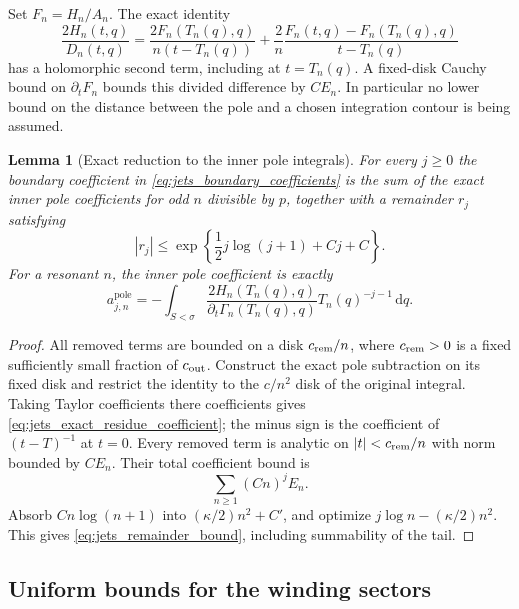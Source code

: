 \documentclass[11pt]{article}
\numberwithin{equation}{section}
\newtheorem{lemma}[theorem]{Lemma}
\theoremstyle{definition}
\newcommand{\dd}{\,\mathrm d}
\begin{document}
Set $F_n=H_n/A_n$. The exact identity
\begin{equation}\label{eq:jets_divided_difference}
 \frac{2H_n(t,q)}{D_n(t,q)}=
 \frac{2F_n(T_n(q),q)}{n(t-T_n(q))}
 +\frac2n\frac{F_n(t,q)-F_n(T_n(q),q)}{t-T_n(q)}
\end{equation}
has a holomorphic second term, including at $t=T_n(q)$. A
fixed-disk Cauchy bound on $\partial_tF_n$ bounds this divided
difference by $CE_n$. In particular no lower bound on the distance
between the pole and a chosen integration contour is being assumed.

\begin{lemma}[Exact reduction to the inner pole integrals]
\label{lem:jets_remainder}
For every $j\ge0$ the boundary coefficient in
\eqref{eq:jets_boundary_coefficients} is the sum of the exact inner
pole coefficients for odd $n$ divisible by $p$, together with a
remainder $r_j$ satisfying
\begin{equation}\label{eq:jets_remainder_bound}
 |r_j|\le \exp\left\{\frac12j\log(j+1)+Cj+C\right\}.
\end{equation}
For a resonant $n$, the inner pole coefficient is exactly
\begin{equation}\label{eq:jets_exact_residue_coefficient}
 a_{j,n}^{\mathrm{pole}}=
 -\int_{S<\sigma}
  \frac{2H_n(T_n(q),q)}{\partial_t\Gamma_n(T_n(q),q)}
  T_n(q)^{-j-1}\dd q.
\end{equation}
\end{lemma}

\begin{proof}
All removed terms are bounded on a disk $c_{\rm rem}/n$, where
$c_{\rm rem}>0$ is a fixed sufficiently small fraction of $c_{\rm out}$.
Construct the exact pole subtraction on its fixed disk and restrict
the identity to the $c/n^2$ disk of the original integral. Taking
Taylor coefficients there
coefficients gives \eqref{eq:jets_exact_residue_coefficient}; the
minus sign is the coefficient of $(t-T)^{-1}$ at $t=0$. Every
removed term is analytic on $|t|<c_{\rm rem}/n$ with norm bounded by $CE_n$.
Their total coefficient bound is
\[
 \sum_{n\ge1}(Cn)^j E_n.
\]
Absorb $Cn\log(n+1)$ into $(\kappa/2)n^2+C'$, and optimize
$j\log n-(\kappa/2)n^2$. This gives
\eqref{eq:jets_remainder_bound}, including summability of the tail.
\end{proof}

\subsection{Uniform bounds for the winding sectors}
\end{document}

